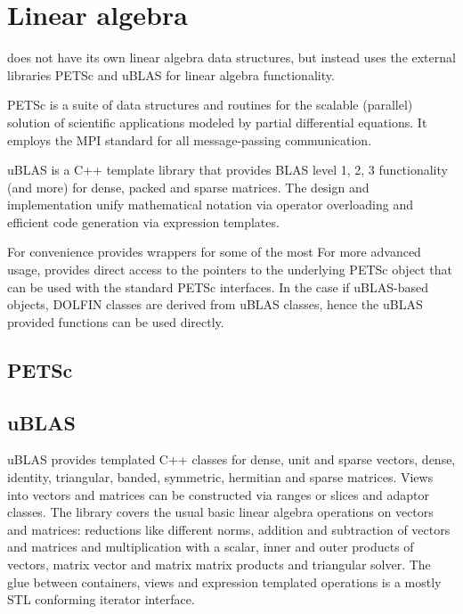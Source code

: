 \chapter{Linear algebra}


\dolfin{} does not have its own linear algebra data structures,
but instead uses the external libraries PETSc \cite{www:petsc}
and uBLAS \cite{www:ublas} for linear algebra functionality.

PETSc is a suite of data structures and routines for the scalable
(parallel) solution of scientific applications modeled by partial
differential equations. It employs the MPI standard for all 
message-passing communication.

uBLAS is a C++ template library that provides BLAS level 1, 2, 3
functionality (and more) for dense, packed and sparse matrices.
The design and implementation unify mathematical notation via operator
overloading and efficient code generation via expression templates.

For convenience \dolfin{} provides wrappers for some of the most
For more advanced usage, \dolfin{} provides direct access to the pointers
to the underlying PETSc object that can be used with the standard PETSc 
interfaces. In the case if uBLAS-based objects, DOLFIN classes are derived
from uBLAS classes, hence the uBLAS provided functions can be used directly.


\section{PETSc}

\section{uBLAS}
%
uBLAS provides templated C++ classes for dense, unit and sparse vectors,
dense, identity, triangular, banded, symmetric, hermitian and sparse matrices. 
Views into vectors and matrices can be constructed via ranges or slices and 
adaptor classes. The library covers the usual basic linear algebra operations on
vectors and matrices: reductions like different norms, addition and subtraction 
of vectors and matrices and multiplication with a scalar, inner and outer 
products of vectors, matrix vector and matrix matrix products and triangular 
solver. The glue between containers, views and expression templated operations 
is a mostly STL conforming iterator interface.


